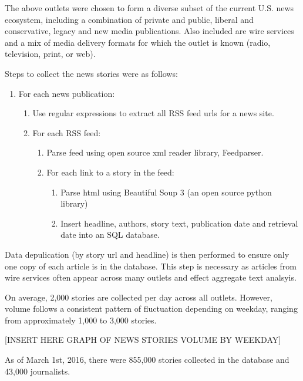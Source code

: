 The above outlets were chosen to form a diverse subset of the current U.S. news ecosystem, including a combination of private and public, liberal and conservative, legacy and new media publications. Also included are wire services and a mix of media delivery formats for which the outlet is known (radio, television, print, or web).  

Steps to collect the news stories were as follows:

 \begin{enumerate}
    \item For each news publication:
    \begin {enumerate}
    \itemsep-1em 
        \item Use regular expressions to extract all RSS feed urls for a news site.
        \item For each RSS feed:
        \begin {enumerate}
        \itemsep-1em 
            \item Parse feed using open source xml reader library, Feedparser.
            \item For each link to a story in the feed:             
            \begin {enumerate}
                \item Parse html using Beautiful Soup 3 (an open source python library)
                \item Insert headline, authors, story text, publication date and retrieval date into an SQL database.

            \end {enumerate}
        \end{enumerate}
    \end{enumerate}
\end{enumerate}

Data depulication (by story url and headline) is then performed to ensure only one copy of each article is in the database. This step is necessary as articles from wire services often appear across many outlets and effect aggregate text analsyis.

On average, 2,000 stories are collected per day across all outlets. However, volume follows a consistent pattern of fluctuation depending on weekday, ranging from approximately 1,000 to 3,000 stories.

[INSERT HERE GRAPH OF NEWS STORIES VOLUME BY WEEKDAY]

As of March 1st, 2016, there were 855,000 stories collected in the database and 43,000 journalists.


